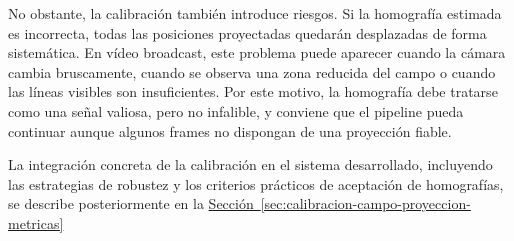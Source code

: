 No obstante, la calibración también introduce riesgos. Si la homografía estimada es incorrecta, todas las posiciones proyectadas quedarán desplazadas de forma sistemática. En vídeo broadcast, este problema puede aparecer cuando la cámara cambia bruscamente, cuando se observa una zona reducida del campo o cuando las líneas visibles son insuficientes. Por este motivo, la homografía debe tratarse como una señal valiosa, pero no infalible, y conviene que el pipeline pueda continuar aunque algunos frames no dispongan de una proyección fiable.

La integración concreta de la calibración en el sistema desarrollado, incluyendo las estrategias de robustez y los criterios prácticos de aceptación de homografías, se describe posteriormente en la 
\hyperref[sec:calibracion-campo-proyeccion-metricas]{Sección~\ref*{sec:calibracion-campo-proyeccion-metricas}}
